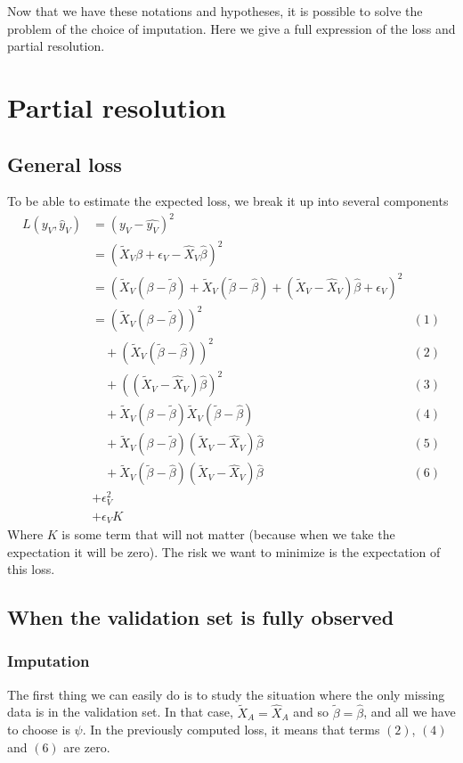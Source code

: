 \documentclass[12pt, a4paper]{memoir}
\begin{document}
Now that we have these notations and hypotheses, it is possible to solve the problem of the choice of imputation. Here we give a full expression of the loss and partial resolution.

	\section{Partial resolution}
		\subsection{General loss}
To be able to estimate the expected loss, we break it up into several components
\begin{align*}
L(y_V, \hat{y}_V) &= (y_V - \hat{y_V})^2 &\\
				   &= (\tilde{X}_V \beta + \epsilon_V - \hat{X}_V \hat{\beta})^2 &\\
				   &= (\tilde{X}_V(\beta - \tilde{\beta}) + \tilde{X}_V (\tilde{\beta} - \hat{\beta}) + (\tilde{X}_V - \hat{X}_V) \hat{\beta} + \epsilon_V)^2 & \\
				   &= (\tilde{X}_V (\beta - \tilde{\beta}))^2 & (1) \\
				   & \quad + (\tilde{X}_V (\tilde{\beta}-\hat{\beta}))^2 &(2) \\
				   & \quad + ((\tilde{X}_V - \hat{X}_V) \hat{\beta})^2 &(3) \\
				   & \quad + \tilde{X}_V (\beta - \tilde{\beta}) \tilde{X}_V (\tilde{\beta} - \hat{\beta}) & (4) \\
				   & \quad + \tilde{X}_V (\beta - \tilde{\beta}) (\tilde{X}_V - \hat{X}_V )\hat{\beta} & (5) \\
				   & \quad + \tilde{X}_V (\tilde{\beta} - \hat{\beta}) (\tilde{X}_V - \hat{X}_V) \hat{\beta} & (6)\\
				   & + \epsilon_V^2 &\\
				   & + \epsilon_V K
\end{align*}
Where $K$ is some term that will not matter (because when we take the expectation it will be zero). The risk we want to minimize is the expectation of this loss.
		\subsection{When the validation set is fully observed}
			\subsubsection{Imputation}
The first thing we can easily do is to study the situation where the only missing data is in the validation set. In that case, $\tilde{X}_A = \hat{X}_A$ and so $\tilde{\beta} = \hat{\beta}$, and all we have to choose is $\psi$. In the previously computed loss, it means that terms $(2)$, $(4)$ and $(6)$ are zero.
\end{document}
